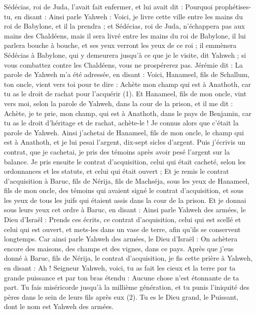\begin{multicols}{2}
Sédécias, roi de Juda, l'avait fait enfermer, et lui avait dit : Pourquoi prophétises-tu, en disant : Ainsi parle Yahweh : Voici, je livre cette ville entre les mains du roi de Babylone, et il la prendra ;
et Sédécias, roi de Juda, n'échappera pas aux mains des Chaldéens, mais il sera livré entre les mains du roi de Babylone, il lui parlera bouche à bouche, et ses yeux verront les yeux de ce roi ;
il emmènera Sédécias à Babylone, qui y demeurera jusqu’à ce que je le visite, dit Yahweh ; si vous combattez contre les Chaldéens, vous ne prospérerez pas.
Jérémie dit : La parole de Yahweh m'a été adressée, en disant :
Voici, Hanameel, fils de Schallum, ton oncle, vient vers toi pour te dire : Achète mon champ qui est à Anathoth, car tu as le droit de rachat pour l’acquérir\FTNT{} (1).
Et Hanameel, fils de mon oncle, vint vers moi, selon la parole de Yahweh, dans la cour de la prison, et il me dit : Achète, je te prie, mon champ, qui est à Anathoth, dans le pays de Benjamin, car tu as le droit d’héritage et de rachat, achète-le ! Je connus alors que c'était la parole de Yahweh.
Ainsi j'achetai de Hanameel, fils de mon oncle, le champ qui est à Anathoth, et je lui pesai l'argent, dix-sept sicles d'argent.
Puis j'écrivis un contrat, que je cachetai, je pris des témoins après avoir pesé l'argent sur la balance.
Je pris ensuite le contrat d’acquisition, celui qui était cacheté, selon les ordonnances et les statuts, et celui qui était ouvert ;
Et je remis le contrat d’acquisition à Baruc, fils de Nérija, fils de Machséja, sous les yeux de Hanameel, fils de mon oncle, des témoins qui avaient signé le contrat d’acquisition, et sous les yeux de tous les juifs qui étaient assis dans la cour de la prison.
Et je donnai sous leurs yeux cet ordre à Baruc, en disant :
Ainsi parle Yahweh des armées, le Dieu d'Israël : Prends ces écrits, ce contrat d’acquisition, celui qui est scellé et celui qui est ouvert, et mets-les dans un vase de terre, afin qu'ils se conservent longtemps.
Car ainsi parle Yahweh des armées, le Dieu d'Israël : On achètera encore des maisons, des champs et des vignes, dans ce pays.
Après que j’eus donné à Baruc, fils de Nérija, le contrat d’acquisition, je fis cette prière à Yahweh, en disant :
Ah ! Seigneur Yahweh, voici, tu as fait les cieux et la terre par ta grande puissance et par ton bras étendu : Aucune chose n’est étonnante de ta part.
Tu fais miséricorde jusqu'à la millième génération, et tu punis l'iniquité des pères dans le sein de leurs fils après eux\FTNT{} (2). Tu es le Dieu grand, le Puissant, dont le nom est Yahweh des armées.

\end{multicols}
